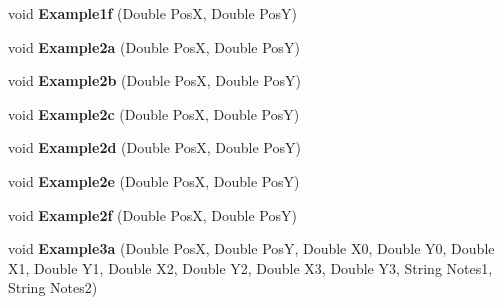 \begin{DoxyCompactItemize}
\item 
void {\bfseries Example1f} (Double PosX, Double PosY)\hypertarget{class_test_pdf_file_writer_1_1_other_example_a6c81bb3b2d7e19ff013b1772a0bebef8}{}\label{class_test_pdf_file_writer_1_1_other_example_a6c81bb3b2d7e19ff013b1772a0bebef8}

\item 
void {\bfseries Example2a} (Double PosX, Double PosY)\hypertarget{class_test_pdf_file_writer_1_1_other_example_a27eb09964061768a1aa8ccba12bbe470}{}\label{class_test_pdf_file_writer_1_1_other_example_a27eb09964061768a1aa8ccba12bbe470}

\item 
void {\bfseries Example2b} (Double PosX, Double PosY)\hypertarget{class_test_pdf_file_writer_1_1_other_example_a3da7930cdf9bc914fc6e705756d37163}{}\label{class_test_pdf_file_writer_1_1_other_example_a3da7930cdf9bc914fc6e705756d37163}

\item 
void {\bfseries Example2c} (Double PosX, Double PosY)\hypertarget{class_test_pdf_file_writer_1_1_other_example_a083a299b7089c0aa606ea0ea9c5d577c}{}\label{class_test_pdf_file_writer_1_1_other_example_a083a299b7089c0aa606ea0ea9c5d577c}

\item 
void {\bfseries Example2d} (Double PosX, Double PosY)\hypertarget{class_test_pdf_file_writer_1_1_other_example_a6aa5d7d0d2f6329ae03fb88f58a9498c}{}\label{class_test_pdf_file_writer_1_1_other_example_a6aa5d7d0d2f6329ae03fb88f58a9498c}

\item 
void {\bfseries Example2e} (Double PosX, Double PosY)\hypertarget{class_test_pdf_file_writer_1_1_other_example_a99b1a5c9e8b6150803630767097c69d2}{}\label{class_test_pdf_file_writer_1_1_other_example_a99b1a5c9e8b6150803630767097c69d2}

\item 
void {\bfseries Example2f} (Double PosX, Double PosY)\hypertarget{class_test_pdf_file_writer_1_1_other_example_a33dacc7907b1b43f55e42f14153d8798}{}\label{class_test_pdf_file_writer_1_1_other_example_a33dacc7907b1b43f55e42f14153d8798}

\item 
void {\bfseries Example3a} (Double PosX, Double PosY, Double X0, Double Y0, Double X1, Double Y1, Double X2, Double Y2, Double X3, Double Y3, String Notes1, String Notes2)\hypertarget{class_test_pdf_file_writer_1_1_other_example_a39bff1959c422787dab05280eb23aa22}{}\label{class_test_pdf_file_writer_1_1_other_example_a39bff1959c422787dab05280eb23aa22}


\end{DoxyCompactItemize}
